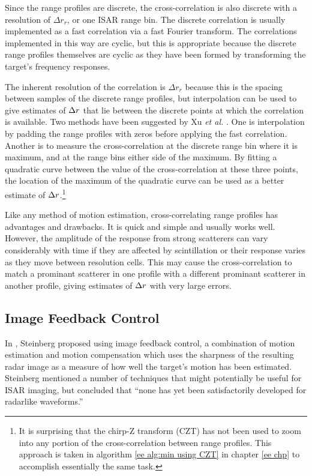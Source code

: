 Since the range profiles are discrete, the cross-correlation is also
discrete with a resolution of $\Delta r_r$, or one ISAR range bin.  The
discrete correlation is usually implemented as a fast correlation via a fast
Fourier transform.  The correlations implemented in this way are cyclic, but
this is appropriate because the discrete range profiles themselves are
cyclic as they have been formed by transforming the target's frequency
responses.

The inherent resolution of the correlation is $\Delta r_r$ because this is
the spacing between samples of the discrete range profiles, but
interpolation can be used to give estimates of ${\Delta r}$ that lie 
between the discrete points at which the correlation is available.  Two
methods have been suggested by Xu {\em et al.\/} \cite{Xu89,Xu90a,Xu90b}.
One is interpolation by padding the range profiles with zeros before
applying the fast correlation.  Another is to measure the cross-correlation
at the discrete range bin where it is maximum, and at the range bins either
side of the maximum.  By fitting a quadratic curve between the value of the
cross-correlation at these three points, the location of the maximum of the 
quadratic curve
can be used as a better estimate of ${\Delta r}$.\footnote{It is surprising that
the chirp-Z transform (CZT) has not been used to zoom into any portion of the
cross-correlation between range profiles.  This approach is taken in 
algorithm \protect\ref{ee alg:min using CZT} in chapter \protect\ref{ee chp} 
to accomplish essentially the same task.}

Like any method of motion estimation, cross-correlating range profiles has 
advantages and drawbacks.  It is quick and simple and usually works well. 
However, the amplitude of the response from strong scatterers can vary
considerably with time if they are affected by scintillation or their
response varies as they move between resolution cells.  This may cause the
cross-correlation to match a prominant scatterer in one profile with a
different prominant scatterer in another profile, giving estimates
of ${\Delta r}$ with very large errors.

\subsection{Image Feedback Control}
\label{mc sec:en}

In \cite{Ste83}, Steinberg proposed using image feedback control, a
combination of motion estimation and motion compensation which uses the
sharpness of the resulting radar image as a measure of how well the
target's motion has been estimated.  Steinberg mentioned a number of
techniques that might potentially be useful for ISAR imaging, but concluded
that ``none has yet been satisfactorily developed for radarlike waveforms.''

